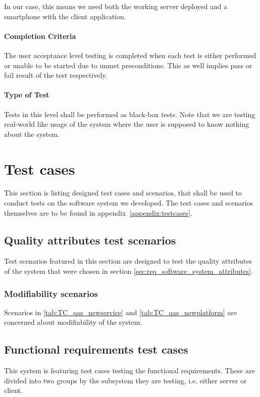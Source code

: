 \documentclass[11pt]{book}
\begin{document}
In our case, this means we need both the working server deployed and a smartphone with the client application.

\paragraph{Completion Criteria}
The user acceptance level testing is completed when each test is either performed or unable to be started due to unmet preconditions. This as well implies pass or fail result of the test respectively.

\paragraph{Type of Test}
Tests in this level shall be performed as black-box tests. Note that we are testing real-world like usage of the system where the user is supposed to know nothing about the system.


\section{Test cases} \label{sec:test_cases}

This section is listing designed test cases and scenarios, that shall be used to conduct tests on the software system we developed. The test cases and scenarios themselves are to be found in appendix~\ref{appendix:testcases}.

\subsection{Quality attributes test scenarios}\label{sec:qatestscenarios}
Test scenarios featured in this section are designed to test the quality attributes of the system that were chosen in section \ref{sec:req_software_system_attributes}.

\subsubsection{Modifiability scenarios}
Scenarios in \ref{tab:TC_qas_newservice} and \ref{tab:TC_qas_newplatform} are concerned about modifiability of the system.

\subsection{Functional requirements test cases}

This system is featuring test cases testing the functional requirements. These are divided into two groups by the subsystem they are testing, i.e. either server or client.
\end{document}
